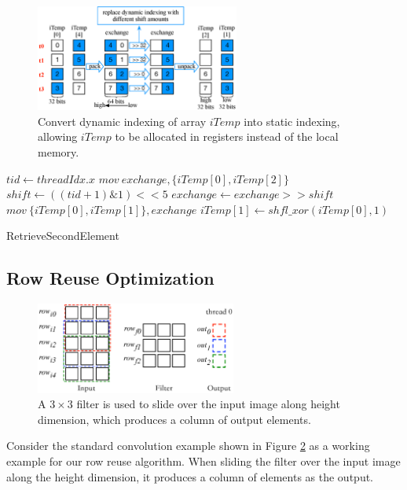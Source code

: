 \begin{figure}[t!]
	\centering
	\includegraphics[width=0.8\columnwidth,height=3.5cm]{./figure/exchange.eps}
\caption{Convert dynamic indexing of array $iTemp$ into static indexing, allowing  $iTemp$ to be allocated in registers instead of the local memory.}
\label{fig:exchange}
\end{figure}


\begin{algorithm}[t!]
\small
	$tid \gets threadIdx.x$\;
	$mov\ exchange, \{iTemp[0], iTemp[2]\}$\;
	$shift \gets ((tid+1)\&1)<<5$\;
	$exchange \gets exchange >> shift$\;
	$mov\ \{iTemp[0],iTemp[1]\}, exchange$\;
	$iTemp[1] \gets shfl\_xor(iTemp[0],1)$\;	
	\caption{RetrieveSecondElement}
	\label{algo:basic2}
\end{algorithm}


\subsection{Row Reuse Optimization}
\label{sec:rowreuse}
\begin{figure}[t!]
	\centering
	\includegraphics[width=0.8\columnwidth,height=3cm]{./figure/rowreuse.eps}
\caption{A $3 \times 3$ filter is used to slide over the input image along height dimension, which produces a column of output elements.}
\label{fig:rowreuse}
\end{figure}

 Consider the standard convolution example shown in Figure \ref{fig:rowreuse} as a working example for our row
reuse algorithm. When sliding the filter over the input image along the height dimension, it produces a column of elements as the output.


